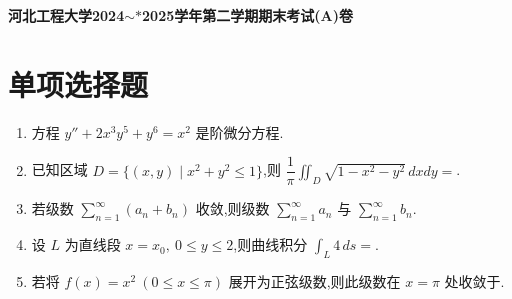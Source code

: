 \setcounter{section}{0}
\begin{center}
	\textbf{河北工程大学2024$\sim*$2025学年第二学期期末考试(A)卷}
\end{center}

\section{单项选择题}

\begin{enumerate}
	\item 方程 $y''+2x^3y^5+y^6=x^2$ 是\underline{\hspace{2cm}}阶微分方程.
	
	\item 已知区域 $D=\{(x,y)\mid x^2+y^2\le 1\}$,则
	$\dfrac{1}{\pi}\iint_D\sqrt{1-x^2-y^2}\,dxdy=$\underline{\hspace{2cm}}.
	
	\item 若级数 $\sum_{n=1}^{\infty}(a_n+b_n)$ 收敛,则级数 $\sum_{n=1}^{\infty}a_n$ 与 $\sum_{n=1}^{\infty}b_n$\underline{\hspace{2cm}}.
	
	\item 设 $L$ 为直线段 $x=x_0,\ 0\le y\le 2$,则曲线积分 $\int_L 4\,ds=$\underline{\hspace{2cm}}.
	
	\item 若将 $f(x)=x^2\ (0\le x\le \pi)$ 展开为正弦级数,则此级数在 $x=\pi$ 处收敛于\underline{\hspace{2cm}}.
\end{enumerate}

